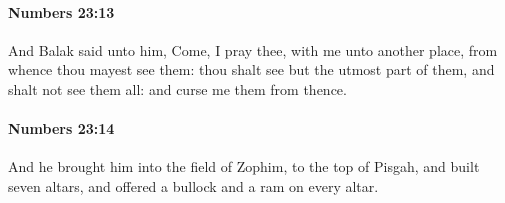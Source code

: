 		\paragraph{Numbers 23:13} %
			\label{NUMBERS-23-13}

			And Balak said unto him, Come, I pray thee, with me unto another place, from whence thou mayest see them: thou shalt see but the utmost part of them, and shalt not see them all: and curse me them from thence.


		\paragraph{Numbers 23:14} %
			\label{NUMBERS-23-14}

			And he brought him into the field of Zophim, to the top of Pisgah, and built seven altars, and offered a bullock and a ram on every altar.


